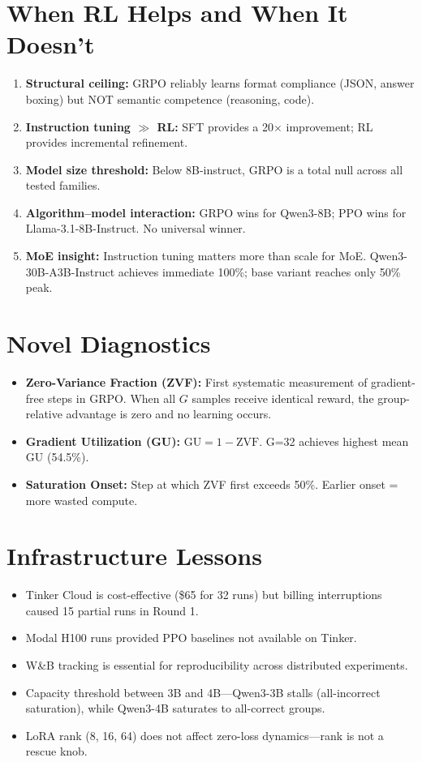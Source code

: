 \documentclass[12pt,a4paper]{report}
\theoremstyle{definition}
\begin{document}
\section{When RL Helps and When It Doesn't}
\label{sec:when-rl}

\begin{enumerate}[nosep]
\item \textbf{Structural ceiling:} GRPO reliably learns format compliance (JSON, answer boxing) but NOT semantic competence (reasoning, code).
\item \textbf{Instruction tuning $\gg$ RL:} SFT provides a 20$\times$ improvement; RL provides incremental refinement.
\item \textbf{Model size threshold:} Below 8B-instruct, GRPO is a total null across all tested families.
\item \textbf{Algorithm--model interaction:} GRPO wins for Qwen3-8B; PPO wins for Llama-3.1-8B-Instruct. No universal winner.
\item \textbf{MoE insight:} Instruction tuning matters more than scale for MoE. Qwen3-30B-A3B-Instruct achieves immediate 100\%; base variant reaches only 50\% peak.
\end{enumerate}

\section{Novel Diagnostics}
\label{sec:novel-diagnostics}

\begin{itemize}[nosep]
\item \textbf{Zero-Variance Fraction (ZVF):} First systematic measurement of gradient-free steps in GRPO. When all $G$ samples receive identical reward, the group-relative advantage is zero and no learning occurs.
\item \textbf{Gradient Utilization (GU):} $\text{GU} = 1 - \text{ZVF}$. G=32 achieves highest mean GU (54.5\%).
\item \textbf{Saturation Onset:} Step at which ZVF first exceeds 50\%. Earlier onset = more wasted compute.
\end{itemize}

\section{Infrastructure Lessons}
\label{sec:infra-lessons}

\begin{itemize}[nosep]
\item Tinker Cloud is cost-effective (\$65 for 32 runs) but billing interruptions caused 15 partial runs in Round 1.
\item Modal H100 runs provided PPO baselines not available on Tinker.
\item W\&B tracking is essential for reproducibility across distributed experiments.
\item Capacity threshold between 3B and 4B---Qwen3-3B stalls (all-incorrect saturation), while Qwen3-4B saturates to all-correct groups.
\item LoRA rank (8, 16, 64) does not affect zero-loss dynamics---rank is not a rescue knob.
\end{itemize}
\end{document}

